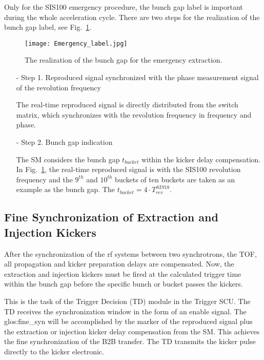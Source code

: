Only for the SIS100 emergency procedure, the bunch gap label is important during the whole acceleration cycle. There are two steps for the realization of the bunch gap label, see Fig.~\ref{Emergency_label}.
\begin{figure}[!htb]
   \centering   
   \texttt{[image: Emergency\_label.jpg]}
   \caption{The realization of the bunch gap for the emergency extraction.}
   \label{Emergency_label}
\end{figure} 

\begin{itemize}
\item[-] Step 1. Reproduced signal synchronized with the phase measurement signal of the revolution frequency

The real-time reproduced signal is directly distributed from the switch matrix, which synchronizes with the revolution frequency in frequency and phase.
\item[-] Step 2. Bunch gap indication

The SM considers the bunch gap $t_{\mathit{bucket}}$ within the kicker delay compensation. In Fig.~\ref{Emergency_label}, the real-time reproduced signal is with the SIS100 revolution frequency and the $9^{th}$ and $10^{th}$ buckets of ten buckets are taken as an example as the bunch gap. The $t_{\mathit{bucket}}=4\cdot T_{\mathit{rev}}^{\mathit{SIS18}}$.

\end{itemize}



\subsection{Fine Synchronization of Extraction and Injection Kickers}
After the synchronization of the rf systems between two synchrotrons, the TOF, all propagation and kicker preparation delays are compensated. Now, the extraction and injection kickers must be fired at the calculated trigger time within the bunch gap before the specific bunch or bucket passes the kickers.
 
This is the task of the Trigger Decision (TD) module in the Trigger SCU. The TD receives the  synchronization window in the form of an enable signal. The \gls{glos:fine_syn} will be accomplished by the marker of the reproduced signal plus the extraction or injection kicker delay compensation from the SM. This achieves the fine synchronization of the B2B transfer. The TD transmits the kicker pulse directly to the kicker electronic.  
 
